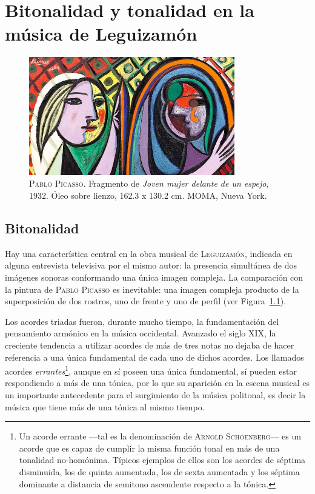 \chapter{Bitonalidad y tonalidad en la música de Leguizamón}
\label{cap:bitonalidad-tonalidad}

\begin{figure}[H]
\centering
\includegraphics[width=0.8\textwidth]{img/picasso-1932}
\caption{\textsc{Pablo Picasso}. Fragmento de \emph{Joven mujer delante de un espejo}, 1932.  Óleo sobre lienzo, 162.3 x 130.2 cm. MOMA, Nueva York.}
\label{fig:picasso-1932}
\end{figure}

\section{Bitonalidad}
\label{sec:bitonalidad}

Hay una característica central en la obra musical de \textsc{Leguizamón}, indicada en alguna entrevista televisiva por el mismo autor: la presencia simultánea de dos imágenes sonoras conformando una única imagen compleja. La comparación con la pintura de \textsc{Pablo Picasso} es inevitable: una imagen compleja producto de la superposición de dos rostros, uno de frente y uno de perfil (ver Figura~\ref{fig:picasso-1932}).

Los acordes triadas fueron, durante mucho tiempo, la fundamentación del pensamiento armónico en la música occidental. Avanzado el siglo XIX, la creciente tendencia a utilizar acordes de más de tres notas no dejaba de hacer referencia a una única fundamental de cada uno de dichos acordes. Los llamados acordes \emph{errantes}\footnote{Un acorde errante ---tal es la denominación de \textsc{Arnold Schoenberg}--- es un acorde que es capaz de cumplir la misma función tonal en más de una tonalidad no-homónima. Típicos ejemplos de ellos son los acordes de séptima disminuida, los de quinta aumentada, los de sexta aumentada y los séptima dominante a distancia de semitono ascendente respecto a la tónica.}, aunque en sí poseen una única fundamental, sí pueden estar respondiendo a más de una tónica, por lo que su aparición en la escena musical es un importante antecedente para el surgimiento de la música politonal, es decir la música que tiene más de una tónica al mismo tiempo.

